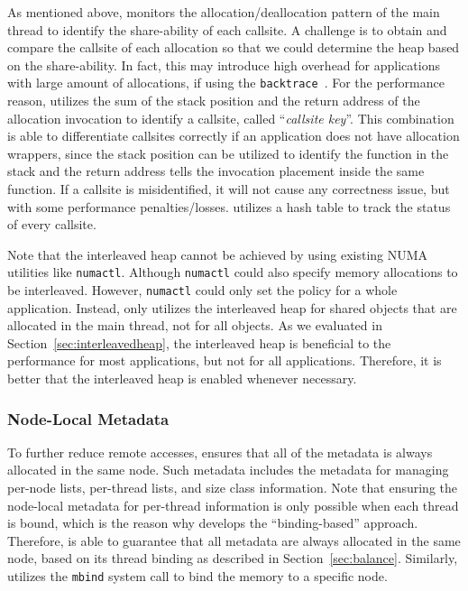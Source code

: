 As mentioned above, \NM{} monitors the  allocation/deallocation pattern of the main thread to identify the share-ability of each callsite. 
A challenge is to obtain and compare the callsite of each allocation so that we could determine the heap based on the share-ability. In fact, this may introduce high overhead for applications with large amount of allocations, if using the \texttt{backtrace}~\cite{DBLP:conf/icse/SumnerZWZ10, DBLP:conf/cgo/ZengR0AJ014}. For the performance reason, \NA{} utilizes the sum of the stack position and the return address of the allocation invocation to identify a callsite, called ``\textit{callsite key}''. This combination is able to differentiate callsites correctly if an application does not have allocation wrappers, since the stack position can be utilized to identify the function in the stack and the return address tells the invocation placement inside the same function. If a callsite is misidentified, it will not cause any correctness issue, but with some performance penalties/losses. \NA{} utilizes a hash table to track the status of every callsite. 
 
Note that the interleaved heap cannot be achieved by using existing NUMA utilities like \texttt{numactl}. Although \texttt{numactl} could also specify memory allocations to be interleaved. However, \texttt{numactl} could only set the policy for a whole application. Instead, \NM{} only utilizes the interleaved heap for shared objects that are allocated in the main thread, not for all objects. As we evaluated in Section~\ref{sec:interleavedheap}, the interleaved heap is beneficial to the performance for most applications, but not for all applications. Therefore, it is better that the interleaved heap is enabled whenever necessary. 

\subsubsection{Node-Local Metadata} 
To further reduce remote accesses, \NM{} ensures that all of the metadata is always allocated in the same node. Such metadata includes the metadata for managing per-node lists, per-thread lists, and size class information. Note that ensuring the node-local metadata for per-thread information is only possible when each thread is bound, which is the reason why \NM{} develops the ``binding-based'' approach. Therefore, \NM{} is able to guarantee that all metadata are always allocated in the same node, based on its thread binding as described in Section~\ref{sec:balance}.  
Similarly, \NM{} utilizes the \texttt{mbind} system call to bind the memory to a specific node.  


